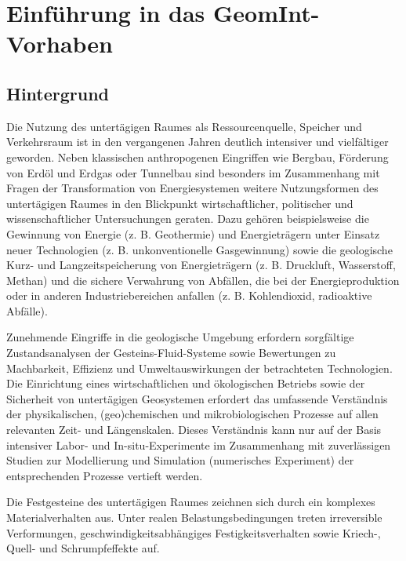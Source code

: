 \chapter*{Einführung in das GeomInt-Vorhaben}
\label{cha:geomint-de}


\section*{Hintergrund} 

Die Nutzung des untertägigen Raumes als Ressourcenquelle, Speicher und Verkehrsraum ist in den vergangenen Jahren deutlich intensiver und vielfältiger geworden. Neben klassischen anthropogenen Eingriffen wie Bergbau, Förderung von Erdöl und Erdgas oder Tunnelbau sind besonders im Zusammenhang mit Fragen der Transformation von Energiesystemen weitere Nutzungsformen des untertägigen Raumes in den Blickpunkt wirtschaftlicher, politischer und wissenschaftlicher Untersuchungen geraten. Dazu gehören beispielsweise die Gewinnung von Energie (z. B. Geothermie) und Energieträgern unter Einsatz neuer Technologien (z. B. unkonventionelle Gasgewinnung) sowie die geologische Kurz- und Langzeitspeicherung von Energieträgern (z. B. Druckluft, Wasserstoff, Methan) und die sichere Verwahrung von Abfällen, die bei der Energieproduktion oder in anderen Industriebereichen anfallen (z. B. Kohlendioxid, radioaktive Abfälle).

Zunehmende Eingriffe in die geologische Umgebung erfordern sorgfältige Zustandsanalysen der Gesteins-Fluid-Systeme sowie Bewertungen zu Machbarkeit, Effizienz und Umweltauswirkungen der betrachteten Technologien. Die Einrichtung eines wirtschaftlichen und ökologischen Betriebs sowie der Sicherheit von untertägigen Geosystemen erfordert das umfassende Verständnis der physikalischen, (geo)chemischen und mikrobiologischen Prozesse auf allen relevanten Zeit- und Längenskalen. Dieses Verständnis kann nur auf der Basis intensiver Labor- und In-situ-Experimente im Zusammenhang mit zuverlässigen Studien zur Modellierung und Simulation (numerisches Experiment) der entsprechenden Prozesse vertieft werden.

Die Festgesteine des untertägigen Raumes zeichnen sich durch ein komplexes Materialverhalten aus. Unter realen Belastungsbedingungen treten irreversible Verformungen, geschwindigkeitsabhängiges Festigkeitsverhalten sowie Kriech-, Quell- und Schrumpfeffekte auf.

